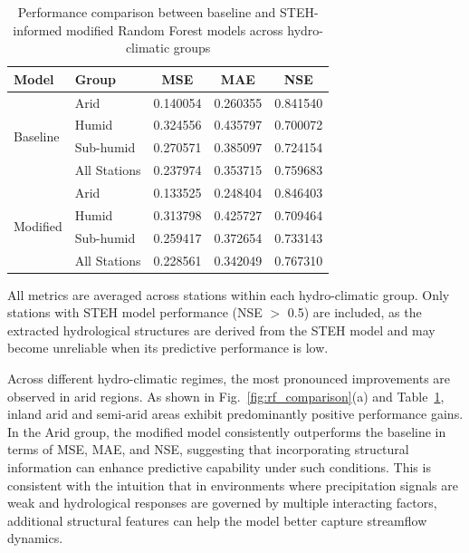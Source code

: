 \begin{table}[htbp]
    \centering
    \begin{threeparttable}
        \caption{Performance comparison between baseline and STEH-informed modified Random Forest models across hydro-climatic groups}
        \begin{tabular*}{\textwidth}{@{\extracolsep{\fill}}llccc}
            \toprule
            Model & Group & MSE & MAE & NSE \\
            \midrule

            \multirow{4}{*}{Baseline}
            & Arid          & 0.140054 & 0.260355 & 0.841540 \\
            & Humid         & 0.324556 & 0.435797 & 0.700072 \\
            & Sub-humid     & 0.270571 & 0.385097 & 0.724154 \\
            & All Stations  & 0.237974 & 0.353715 & 0.759683 \\

            \midrule

            \multirow{4}{*}{Modified}
            & Arid          & 0.133525 & 0.248404 & 0.846403 \\
            & Humid         & 0.313798 & 0.425727 & 0.709464 \\
            & Sub-humid     & 0.259417 & 0.372654 & 0.733143 \\
            & All Stations  & 0.228561 & 0.342049 & 0.767310 \\

            \bottomrule
        \end{tabular*}

        \begin{tablenotes}
            \footnotesize
            \item All metrics are averaged across stations within each hydro-climatic group. Only stations with STEH model performance (NSE $>$ 0.5) are included, as the extracted hydrological structures are derived from the STEH model and may become unreliable when its predictive performance is low.
        \end{tablenotes}

        \label{tab:rf_performance}
    \end{threeparttable}
\end{table}

Across different hydro-climatic regimes, the most pronounced improvements are observed in arid regions. As shown in Fig.~\ref{fig:rf_comparison}(a) and Table~\ref{tab:rf_performance}, inland arid and semi-arid areas exhibit predominantly positive performance gains. In the Arid group, the modified model consistently outperforms the baseline in terms of MSE, MAE, and NSE, suggesting that incorporating structural information can enhance predictive capability under such conditions. This is consistent with the intuition that in environments where precipitation signals are weak and hydrological responses are governed by multiple interacting factors\cite{TAKEFUJI2025123514}, additional structural features can help the model better capture streamflow dynamics.

